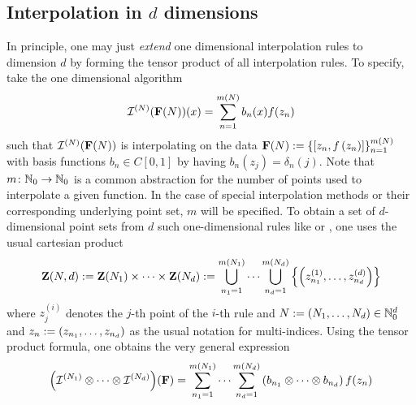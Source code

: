 \documentclass[12pt, oneside]{amsart}
\theoremstyle{definition}
\theoremstyle{remark}
\numberwithin{equation}{section}
\begin{document}
\subsection*{Interpolation in \(d\) dimensions} In principle, one may just 
\emph{extend} one dimensional interpolation rules to dimension \(d\) by 
forming the tensor product of all interpolation rules. To specify, take the one 
dimensional algorithm
\begin{equation}\label{eq:general1dInterpolation}
    \mathcal{I}^{(N)}(\mathbf{F}(N))(x) = \sum_{n = 1}^{m(N)} b_{n}(x) f(z_n)
\end{equation}
such that \(\mathcal{I}^{(N)}(\mathbf{F}(N))\) is interpolating on the data \(\mathbf{F}(N) := 
\left\{\left[z_n, f\left(z_n\right)\right]\right\}_{n=1}^{m(N)}\) with basis functions 
\(b_n \in C[0, 1]\) by having \(b_n(z_j) = \delta_n(j)\). Note that 
$m\colon\mathbb{N}_0\to\mathbb{N}_0$ is a common abstraction for the number of points used to 
interpolate a given function. In the case of special interpolation methods or 
their corresponding underlying point set, $m$ will be specified.\newline
To obtain a set of $d$-dimensional point sets from $d$ such one-dimensional 
rules like  or , one uses the usual 
cartesian product %
\begin{equation}\label{eq:cartProduct}
	\mathbf{Z}(N, d) := \mathbf{Z}(N_1) \times \cdots \times \mathbf{Z}(N_d) := 
	\bigcup_{n_1=1}^{m(N_1)} \cdots \bigcup_{n_d=1}^{m(N_d)} 
	\left\{\left(z_{n_1}^{(1)}, \dots, z_{n_d}^{(d)}\right)\right\}
\end{equation}
where $z_j^{(i)}$ denotes the $j$-th point of the $i$-th rule and \(N := 
\left(N_1, \dots, N_d\right) \in \mathbb{N}_0^d\) and $z_n:= (z_{n_1}, \ldots, 
z_{n_d})$ as the usual notation for multi-indices. Using the 
tensor product formula, one obtains the very general expression
\begin{equation}\label{eq:tensorProdInterp}
    {\left( \mathcal{I}^{(N_1)} \otimes \cdots \otimes \mathcal{I}^{(N_d)} \right)}(\mathbf{F})
    = \sum_{n_1 = 1}^{m(N_1)} \cdots \sum_{n_d = 1}^{m(N_d)} \left( b_{n_1} 
    \otimes \cdots \otimes b_{n_d} \right) f(z_{n})
\end{equation}
\end{document}
